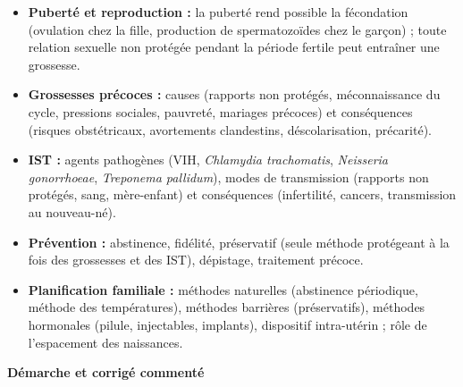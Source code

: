 \documentclass[11pt]{article}
\newcommand{\cle}[1]{{\popxbold\color{popdark}#1}}
\begin{document}
\begin{aretenir}
\begin{itemize}
\item \textbf{Puberté et reproduction :} la puberté rend possible la fécondation (ovulation chez la fille, production de spermatozoïdes chez le garçon) ; toute relation sexuelle non protégée pendant la période fertile peut entraîner une grossesse.
\item \textbf{Grossesses précoces :} causes (rapports non protégés, méconnaissance du cycle, pressions sociales, pauvreté, mariages précoces) et conséquences (risques obstétricaux, avortements clandestins, déscolarisation, précarité).
\item \textbf{IST :} agents pathogènes (VIH, \emph{Chlamydia trachomatis}, \emph{Neisseria gonorrhoeae}, \emph{Treponema pallidum}), modes de transmission (rapports non protégés, sang, mère-enfant) et conséquences (infertilité, cancers, transmission au nouveau-né).
\item \textbf{Prévention :} abstinence, fidélité, \cle{préservatif} (seule méthode protégeant à la fois des grossesses et des IST), dépistage, traitement précoce.
\item \textbf{Planification familiale :} méthodes naturelles (abstinence périodique, méthode des températures), méthodes barrières (préservatifs), méthodes hormonales (pilule, injectables, implants), dispositif intra-utérin ; rôle de l'espacement des naissances.
\end{itemize}
\end{aretenir}

\textbf{Démarche et corrigé commenté}\par
\end{document}
